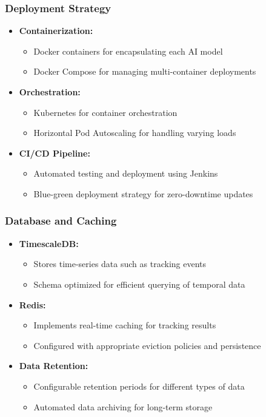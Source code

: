 \subsubsection{Deployment Strategy}
\label{subsubsection:deployment-strategy}

\begin{itemize}
    \item \textbf{Containerization:} 
    \begin{itemize}
        \item Docker containers for encapsulating each AI model
        \item Docker Compose for managing multi-container deployments
    \end{itemize}
    \item \textbf{Orchestration:} 
    \begin{itemize}
        \item Kubernetes for container orchestration
        \item Horizontal Pod Autoscaling for handling varying loads
    \end{itemize}
    \item \textbf{CI/CD Pipeline:} 
    \begin{itemize}
        \item Automated testing and deployment using Jenkins
        \item Blue-green deployment strategy for zero-downtime updates
    \end{itemize}
\end{itemize}

\subsubsection{Database and Caching}
\label{subsubsection:database-caching}

\begin{itemize}
    \item \textbf{TimescaleDB:} 
    \begin{itemize}
        \item Stores time-series data such as tracking events
        \item Schema optimized for efficient querying of temporal data
    \end{itemize}
    \item \textbf{Redis:} 
    \begin{itemize}
        \item Implements real-time caching for tracking results
        \item Configured with appropriate eviction policies and persistence
    \end{itemize}
    \item \textbf{Data Retention:} 
    \begin{itemize}
        \item Configurable retention periods for different types of data
        \item Automated data archiving for long-term storage
    \end{itemize}
\end{itemize}

